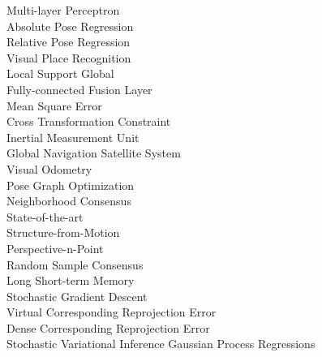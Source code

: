 \begin{arc}
			{Multi-layer Perceptron } 		\\
			{Absolute Pose Regression} 		\\
			{Relative Pose Regression} 		\\
			{Visual Place Recognition} \\
			{Local Support Global} \\
			{Fully-connected Fusion Layer} \\
			{Mean Square Error} \\
			{Cross Transformation Constraint} \\
			{Inertial Measurement Unit} \\
			{Global Navigation Satellite System} \\
			{Visual Odometry} \\
			{Pose Graph Optimization} \\
			{Neighborhood Consensus} \\
			{State-of-the-art} \\
			{Structure-from-Motion} \\
			{Perspective-n-Point} \\
		{Random Sample Consensus} \\
			{Long Short-term Memory} \\
			{Stochastic Gradient Descent} \\
			{Virtual Corresponding Reprojection Error} \\
			{Dense Corresponding Reprojection Error} \\
	 	{Stochastic Variational Inference Gaussian Process Regressions} \\
\end{arc}


